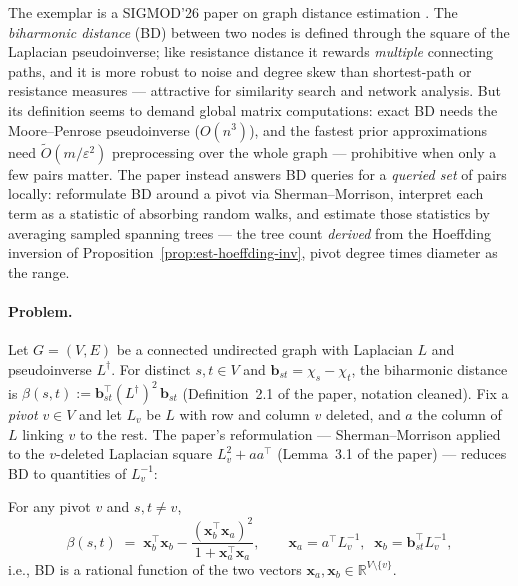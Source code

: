 The exemplar is a SIGMOD'26 paper on graph distance estimation \citep{sigmod26-102}. The
\emph{biharmonic distance} (BD) between two nodes is defined through the square of the
Laplacian pseudoinverse; like resistance distance it rewards \emph{multiple} connecting
paths, and it is more robust to noise and degree skew than shortest-path or resistance
measures --- attractive for similarity search and network analysis. But its definition
seems to demand global matrix computations: exact BD needs the Moore--Penrose pseudoinverse
($O(n^3)$), and the fastest prior approximations need $\widetilde{O}(m/\varepsilon^2)$
preprocessing over the whole graph --- prohibitive when only a few pairs matter. The
paper instead answers BD queries for a \emph{queried set} of pairs locally: reformulate
BD around a pivot via Sherman--Morrison, interpret each term as a statistic of absorbing
random walks, and estimate those statistics by averaging sampled spanning trees --- the
tree count \emph{derived} from the Hoeffding inversion of
Proposition~\ref{prop:est-hoeffding-inv}, pivot degree times diameter as the range.

\paragraph{Problem.}
Let $G = (V,E)$ be a connected undirected graph with Laplacian $L$ and pseudoinverse
$L^\dagger$. For distinct $s,t \in V$ and $\mathbf{b}_{st} = \chi_s - \chi_t$, the biharmonic
distance is $\beta(s,t) := \mathbf{b}_{st}^\top (L^\dagger)^2\, \mathbf{b}_{st}$
(Definition~2.1 of the paper, notation cleaned). Fix a \emph{pivot} $v \in V$ and let $L_v$ be
$L$ with row and column $v$ deleted, and $a$ the column of $L$ linking $v$ to the rest. The
paper's reformulation --- Sherman--Morrison applied to the $v$-deleted Laplacian square
$L_v^2 + aa^\top$ (Lemma~3.1 of the paper) --- reduces BD to quantities of $L_v^{-1}$:

\begin{theorem}
\label{thm:est-bd-reform}
For any pivot $v$ and $s,t \ne v$,
\[
\beta(s,t) \;=\; \mathbf{x}_b^\top \mathbf{x}_b -
\frac{(\mathbf{x}_b^\top \mathbf{x}_a)^2}{1 + \mathbf{x}_a^\top \mathbf{x}_a},
\qquad
\mathbf{x}_a = a^\top L_v^{-1},\;\; \mathbf{x}_b = \mathbf{b}_{st}^\top L_v^{-1},
\]
i.e., BD is a rational function of the two vectors $\mathbf{x}_a, \mathbf{x}_b \in
\mathbb{R}^{V\setminus\{v\}}$. \eop
\end{theorem}

